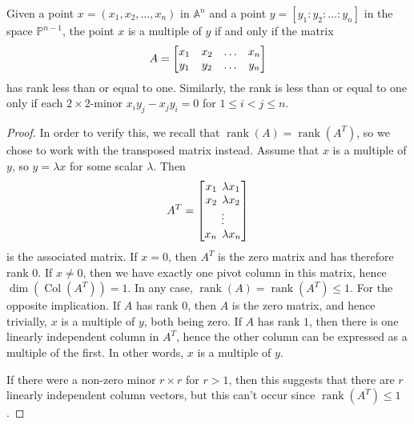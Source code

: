 \documentclass{article}
\newcommand{\A}{\ensuremath{\mathbb{A}}}
\renewcommand{\P}{\ensuremath{\mathbb{P}}}
\DeclareMathOperator{\Col}{Col}
\DeclareMathOperator{\rank}{rank}
\begin{document}
    \begin{proposition}
        \label{prop:point_line}
        Given a point $x = (x_1, x_2, \ldots, x_n)$ in $\A^n$ and a point $y =
        [y_1 : y_2 : \ldots : y_n]$ in the space $\P^{n-1}$, the point $x$ is a
        multiple of $y$ if and only if the matrix
        \begin{equation}
            \notag
            A = \begin{bmatrix}
                x_1 & x_2 & \hdots & x_n \\
                y_1 & y_2 & \hdots & y_n
            \end{bmatrix}
        \end{equation}
        has rank less than or equal to one. Similarly, the rank is less than or
        equal to one only if each $2\times 2$-minor $x_iy_j - x_jy_i = 0$ for
        $1 \leq i < j \leq n$.
    \end{proposition} 
    \begin{proof}
        In order to verify this, we recall that $\rank(A) = \rank(A^T)$, so we
        chose to work with the transposed matrix instead. Assume that $x$ is a
        multiple of $y$, so $y = \lambda x$ for some scalar $\lambda$. Then
        \begin{equation}
            \notag
            A^T = \begin{bmatrix}
                x_1 \;\, \lambda x_1 \\
                x_2 \;\, \lambda x_2 \\
                \vdots \\
                x_n \;\, \lambda x_n
            \end{bmatrix}
        \end{equation}
        is the associated matrix. If $x = 0$, then $A^T$ is the zero matrix and
        has therefore rank 0. If $x \neq 0$, then we have exactly one pivot
        column in this matrix, hence $\dim(\Col(A^T)) = 1$. In any case,
        $\rank(A) = \rank(A^T) \leq 1$. For the opposite implication. If $A$
        has rank 0, then $A$ is the zero matrix, and hence trivially, $x$ is a
        multiple of $y$, both being zero. If $A$ has rank $1$, then there is
        one linearly independent column in $A^T$, hence the other column can be
        expressed as a multiple of the first. In other words, $x$ is a multiple
        of $y$.
        
        If there were a non-zero minor $r\times r$ for $r > 1$, then this
        suggests that there are $r$ linearly independent column vectors, but
        this can't occur since $\rank(A^T) \leq 1$.
    \end{proof}
    
\end{document}
